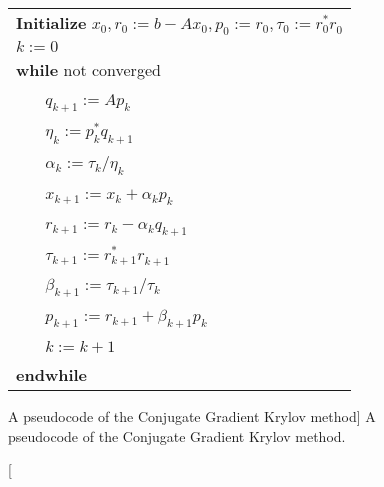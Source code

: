 \begin{figure}[t]
\begin{center}
\begin{tabular}{l}
\hline
\textbf{Initialize} $x_0, r_0 := b-Ax_0, p_0 := r_0, \tau_0 := r_{0}^* r_{0}^{}$
\\ $k := 0$                                                
\\ {\bf while} not converged
\\ ~~~ $q_{k+1}:=Ap_{k}$                        
\\ ~~~ $\eta_k:=p_{k}^*q_{k+1}^{}$    
\\ ~~~ $\alpha_k:=\tau_k/\eta_k$    
\\ ~~~ $x_{k+1}:=x_k+\alpha_k p_{k}$           
\\ ~~~ $r_{k+1}:=r_k-\alpha_k q_{k+1}$            
\\ ~~~ $\tau_{k+1}:= r_{k+1}^* r_{k+1}^{}$  
\\ ~~~ $\beta_{k+1}:=\tau_{k+1}/\tau_{k}$  
\\ ~~~ $p_{k+1}:= r_{k+1} + \beta_{k+1} p_k$ 

\\ ~~~ $k:=k+1$   
\\ {\bf endwhile}  
\\\hline
\end{tabular}
\end{center}
\caption
[A pseudocode of the Conjugate Gradient Krylov method]
{A pseudocode of the Conjugate Gradient Krylov method.}
\label{introduction:fig:cg}
\end{figure}

